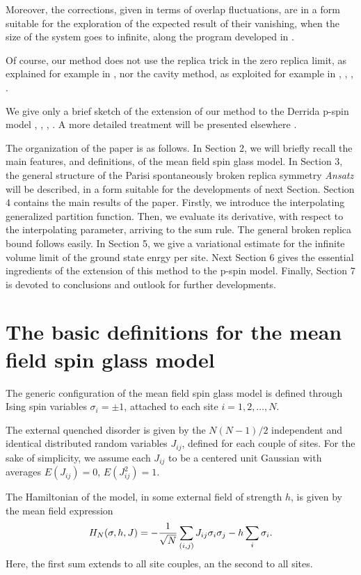 \documentclass[a4paper,12pt]{article}
\begin{document}
Moreover, the corrections, given in terms of overlap fluctuations, are in 
a form suitable for the exploration of the expected result of their vanishing, 
when the size of the system goes to infinite, along the program developed 
in \cite{GTquadr}.

Of course, our method does not use the replica trick in the zero replica 
limit, as explained for example in \cite{MPV}, nor the cavity method, as 
exploited for example in \cite{MPVcavity}, \cite{PS}, \cite{Glocarno}, 
\cite{Tbook}.

We give only a brief sketch of the extension of our method to the Derrida 
p-spin model \cite{D}, \cite{GM}, \cite{Ga}, \cite{Tbook}. A more 
detailed treatment will be presented elsewhere \cite{GTpspin}.

The organization of the paper is as follows. In Section 2, we will briefly 
recall the main features, and definitions, of the mean field spin glass 
model. In Section 3, the general structure of the Parisi spontaneously 
broken replica symmetry {\it Ansatz} will be described, in a form suitable 
for the developments of  next Section. Section 4 contains the main results 
of the paper. Firstly, we introduce the interpolating generalized 
partition function. Then, we evaluate its derivative, with respect to the 
interpolating parameter, arriving to the sum rule. The general broken replica 
 bound follows easily. In Section 5, we give a variational estimate 
for the infinite volume limit of the ground state enrgy per site. 
Next Section 6 gives the essential 
ingredients of the extension of this method to the p-spin model. Finally, 
Section 7 is devoted to conclusions and outlook for further developments.

\section{The basic definitions for the mean field spin glass model}

The generic configuration of the mean field spin glass model is defined 
through Ising spin variables
$\sigma_{i}=\pm 1$,  attached to each site $i=1,2,\dots,N$. 

The external quenched disorder is
given by the $N(N-1)/2$ independent and identical distributed random
variables $J_{ij}$, defined for each couple of sites. For the sake of simplicity,
we assume each $J_{ij}$ to be a centered
unit Gaussian with averages $E(J_{ij})=0$, $ E(J_{ij}^2)=1$.

The Hamiltonian of the model, in some external field of strength $h$,  
is given by the mean field expression
\begin{equation}\label{H}
H_N(\sigma,h,J)=-{1\over\sqrt{N}}\sum_{(i,j)}J_{ij}\sigma_i\sigma_j
-h\sum_{i}\sigma_i.
\end{equation}
Here, the first sum extends to all site couples, an the second to all sites.
\end{document}
